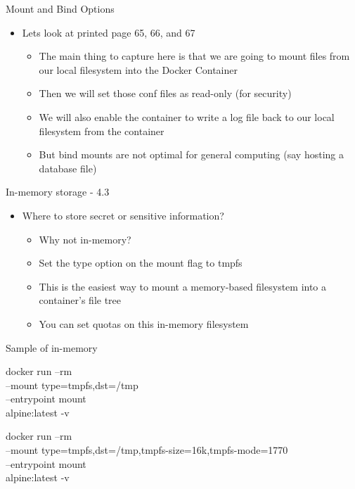 \documentclass[ignorenonframetext,]{beamer}
\providecommand{\tightlist}{%
  \setlength{\itemsep}{0pt}\setlength{\parskip}{0pt}}
\begin{document}
\begin{frame}{Mount and Bind Options}
\protect\hypertarget{mount-and-bind-options}{}

\begin{itemize}
\tightlist
\item
  Lets look at printed page 65, 66, and 67

  \begin{itemize}
  \tightlist
  \item
    The main thing to capture here is that we are going to mount files
    from our local filesystem into the Docker Container
  \item
    Then we will set those conf files as read-only (for security)
  \item
    We will also enable the container to write a log file back to our
    local filesystem from the container
  \item
    But bind mounts are not optimal for general computing (say hosting a
    database file)
  \end{itemize}
\end{itemize}

\end{frame}

\begin{frame}{In-memory storage - 4.3}
\protect\hypertarget{in-memory-storage---4.3}{}

\begin{itemize}
\tightlist
\item
  Where to store secret or sensitive information?

  \begin{itemize}
  \tightlist
  \item
    Why not in-memory?
  \item
    Set the type option on the mount flag to tmpfs
  \item
    This is the easiest way to mount a memory-based filesystem into a
    container's file tree
  \item
    You can set quotas on this in-memory filesystem
  \end{itemize}
\end{itemize}

\end{frame}

\begin{frame}{Sample of in-memory}
\protect\hypertarget{sample-of-in-memory}{}

docker run --rm\\
--mount type=tmpfs,dst=/tmp\\
--entrypoint mount\\
alpine:latest -v

docker run --rm\\
--mount type=tmpfs,dst=/tmp,tmpfs-size=16k,tmpfs-mode=1770\\
--entrypoint mount\\
alpine:latest -v

\end{frame}
\end{document}
